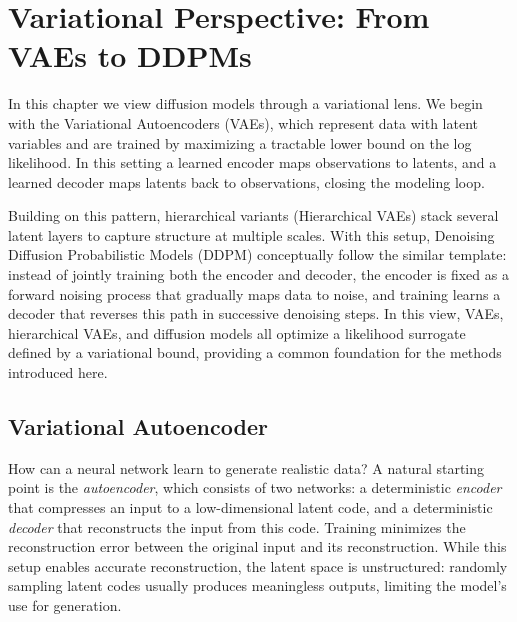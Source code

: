 \chapter{Variational Perspective: From VAEs to DDPMs}\label{ch:variational}


In this chapter we view diffusion models through a variational lens. We begin with the Variational Autoencoders (VAEs), which represent data with latent variables and are trained by maximizing a tractable lower bound on the log likelihood. In this setting a learned encoder maps observations to latents, and a learned decoder maps latents back to observations, closing the modeling loop. 

Building on this pattern, hierarchical variants (Hierarchical VAEs) stack several latent layers to capture structure at multiple scales. With this setup, Denoising Diffusion Probabilistic Models (DDPM) conceptually follow the similar template: instead of jointly training both the encoder and decoder, the encoder is fixed as a forward noising process that gradually maps data to noise, and training learns a decoder that reverses this path in successive denoising steps. In this view, VAEs, hierarchical VAEs, and diffusion models all optimize a likelihood surrogate defined by a variational bound, providing a common foundation for the methods introduced here.




\newpage
\section{Variational Autoencoder}\label{sec:vae}
How can a neural network learn to generate realistic data?  
A natural starting point is the \emph{autoencoder}, which consists of two networks:  
a deterministic \emph{encoder} that compresses an input to a low-dimensional latent code, and a deterministic \emph{decoder} that reconstructs the input from this code.  
Training minimizes the reconstruction error between the original input and its reconstruction.  
While this setup enables accurate reconstruction, the latent space is unstructured: randomly sampling latent codes usually produces meaningless outputs, limiting the model’s use for generation.



